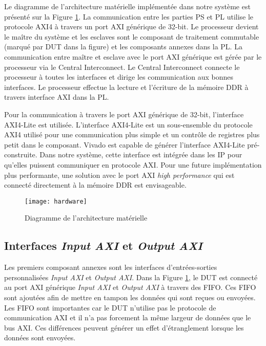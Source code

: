 Le diagramme de l'architecture matérielle implémentée dans notre système est présenté sur la Figure \ref{fig:hard}.
La communication entre les parties PS et PL utilise le protocole AXI4 à travers un port AXI générique
de 32-bit. Le processeur devient le maître du système et les esclaves sont le composant de traitement commutable 
(marqué par \gls{DUT} dans la figure) et les composants annexes dans la PL.
La communication entre maître et esclave avec le port AXI générique est gérée par le processeur via le Central Interconnect. 
Le Central Interconnect connecte le processeur à toutes les interfaces et dirige
les communication aux bonnes interfaces.
Le processeur effectue la lecture et l'écriture de la mémoire DDR à travers interface AXI dans la PL.

Pour la communication à travers le port AXI générique de 32-bit, l'interface AXI4-Lite est utilisée.
L'interface AXI4-Lite est un sous-ensemble du protocole AXI4 utilisé pour une communication
plus simple et un contrôle de registres plus petit dans le composant. Vivado est capable de générer
l'interface AXI4-Lite pré-construite. Dans notre système, cette interface est
intégrée dans les IP pour qu'elles puissent communiquer en protocole AXI.
Pour une future implémentation plus performante, une solution avec le port AXI \emph{high performance} qui est
connecté directement à la mémoire DDR est envisageable. 

\begin{figure}[h]
	\centering
	\texttt{[image: hardware]}
	\caption{Diagramme de l'architecture matérielle}
	\label{fig:hard}
	\vspace{-2mm}
\end{figure}

\subsection{Interfaces \emph{Input AXI} et \emph{Output AXI}}
Les premiers composant annexes sont les interfaces d'entrées-sorties personnalisées \emph{Input AXI} et \emph{Output AXI}.
Dans la Figure \ref{fig:hard}, le DUT est connecté au port AXI générique
\emph{Input AXI} et \emph{Output AXI} à travers des FIFO. Ces FIFO sont ajoutées
afin de mettre en tampon les données qui sont reçues ou envoyées.
Les FIFO sont importantes car le DUT n'utilise pas le protocole
de communication AXI et il n'a pas forcement la même largeur de données que le bus AXI. 
Ces différences peuvent générer un effet d'étranglement lorsque les données sont envoyées.

